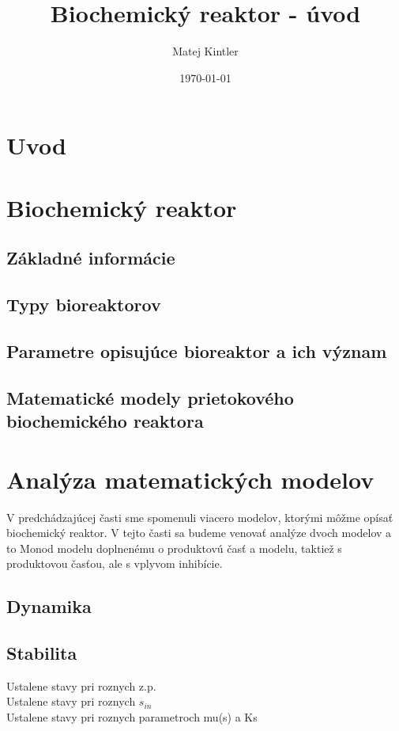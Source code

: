 \documentclass[fleqn]{article}
\title{Biochemický reaktor - úvod}
\author{Matej Kintler}
\date{\today}
\begin{document}
	
\maketitle
\newpage

\tableofcontents
\newpage

\section{Uvod}

\newpage

\section{Biochemický reaktor}
\subsection{Základné informácie}


\subsection{Typy bioreaktorov}


\subsection{Parametre opisujúce bioreaktor a ich význam}


\subsection{Matematické modely prietokového biochemického reaktora}


\section{Analýza matematických modelov}
V predchádzajúcej časti sme spomenuli viacero modelov, ktorými môžme opísať biochemický reaktor. V tejto časti sa budeme venovať analýze dvoch modelov a to Monod modelu doplnenému o produktovú časť a modelu, taktiež s produktovou časťou, ale s vplyvom inhibície.

\subsection{Dynamika}


\subsection{Stabilita}
Ustalene stavy pri roznych z.p. \\
Ustalene stavy pri roznych $s_{in}$ \\
Ustalene stavy pri roznych parametroch mu(s) a Ks \\
\end{document}
